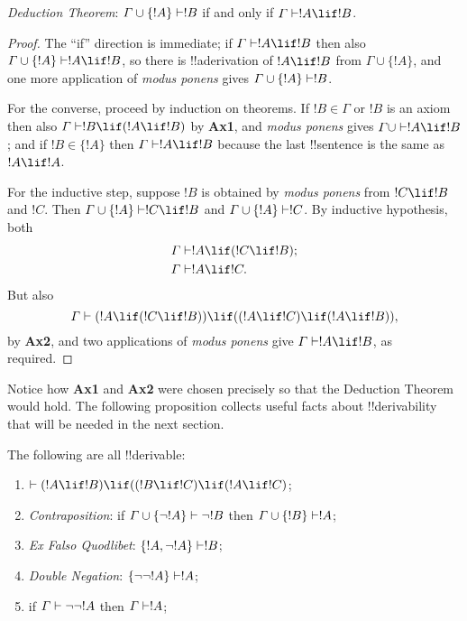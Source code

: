 \documentclass[../../include/open-logic-section]{subfiles}
\begin{document}
\begin{thm}
  \emph{Deduction Theorem}: $\Gamma \cup \{!A\} \Proves !B$ if
  and only if $\Gamma \Proves !A \lif !B$.
\end{thm}
\begin{proof}
  The ``if'' direction is immediate; if $\Gamma \Proves !A \lif
  !B$ then also $\Gamma \cup \{!A\}\Proves !A \lif
  !B$, so there is !!a{derivation} of $!A\lif !B$ from $\Gamma \cup
  \{!A\}$, and one more application of \emph{modus ponens} gives
  $\Gamma \cup \{!A\} \Proves !B$.

  For the converse, proceed by induction on theorems. If $!B \in
  \Gamma$ or $!B$ is an axiom then also $\Gamma \Proves !B \lif
  (!A \lif !B)$ by \textbf{Ax1}, and \emph{modus ponens}
  gives $\Gamma\cup \Proves !A \lif !B$; and if $!B \in \{
  !A\}$ then $\Gamma \Proves !A \lif !B$ because the
  last !!{sentence} is the same as $!A \lif !A$.

  For the inductive step, suppose $!B$ is obtained by \emph{modus
    ponens} from $!C \lif !B$ and $!C$. Then $\Gamma \cup
  \{ !A\} \Proves !C \lif !B$ and $\Gamma \cup \{
  !A\} \Proves !C$. By inductive hypothesis, both 
  \begin{align*}
   & \Gamma \Proves !A \lif (!C \lif !B); \\
   & \Gamma \Proves !A \lif !C.
  \end{align*}
But also
\[
\Gamma \Proves (!A \lif (!C \lif !B)) \lif
((!A\lif !C)  \lif (!A \lif !B)),
\]
by \textbf{Ax2}, and two applications of \emph{modus ponens} give
$\Gamma \Proves !A \lif !B$, as required.
\end{proof}

Notice how \textbf{Ax1} and \textbf{Ax2} were chosen precisely so that
the Deduction Theorem would hold. The following proposition collects
useful facts about !!{derivability} that will be needed in the next
section.

\begin{prop}
  The following are all !!{derivable}:
  \begin{enumerate}
  \item $\Proves (!A \lif !B) \lif ((!B \lif !C)
    \lif (!A \lif !C)$; 
  \item \emph{Contraposition}: if $\Gamma \cup \{ \lnot !A\}
    \Proves \lnot !B$ then $\Gamma \cup \{ !B\} \Proves
    !A$; 
  \item \emph{Ex Falso Quodlibet}: $\{ !A, \lnot!A\} \Proves
    !B$; 
  \item \emph{Double Negation}: $\{ \lnot\lnot!A\} \Proves
    !A$;
  \item if $\Gamma \Proves \lnot\lnot!A$ then $\Gamma \Proves
    !A$;
\end{enumerate}
\end{prop}
\end{document}
